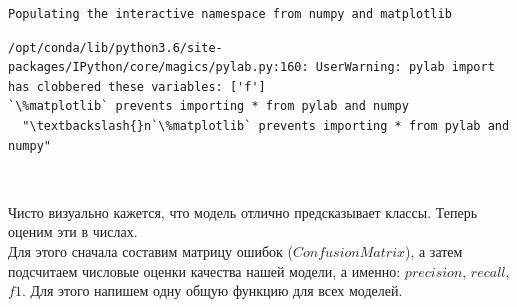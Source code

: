 \documentclass[11pt]{article}
\begin{document}
    \begin{Verbatim}[commandchars=\\\{\}]
Populating the interactive namespace from numpy and matplotlib

    \end{Verbatim}

    \begin{Verbatim}[commandchars=\\\{\}]
/opt/conda/lib/python3.6/site-packages/IPython/core/magics/pylab.py:160: UserWarning: pylab import has clobbered these variables: ['f']
`\%matplotlib` prevents importing * from pylab and numpy
  "\textbackslash{}n`\%matplotlib` prevents importing * from pylab and numpy"

    \end{Verbatim}

    \begin{center}
    \end{center}
    { \hspace*{\fill} \\}
    
    Чисто визуально кажется, что модель отлично предсказывает классы. Теперь
оценим эти в числах.\\
Для этого сначала составим матрицу ошибок (\(Confusion Matrix\)), а
затем подсчитаем числовые оценки качества нашей модели, а именно:
\(precision\), \(recall\), \(f1\). Для этого напишем одну общую функцию
для всех моделей.
\end{document}

